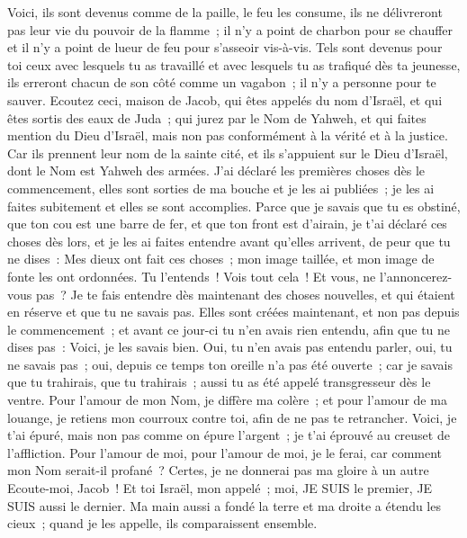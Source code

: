 \begin{multicols}{2}
Voici, ils sont devenus comme de la paille, le feu les consume, ils ne délivreront pas leur vie du pouvoir de la flamme~; il n'y a point de charbon pour se chauffer et il n'y a point de lueur de feu pour s'asseoir vis-à-vis.
Tels sont devenus pour toi ceux avec lesquels tu as travaillé et avec lesquels tu as trafiqué dès ta jeunesse, ils erreront chacun de son côté comme un vagabon~; il n'y a personne pour te sauver.
\VerseOne{}Ecoutez ceci, maison de Jacob, qui êtes appelés du nom d'Israël, et qui êtes sortis des eaux de Juda~; qui jurez par le Nom de Yahweh, et qui faites mention du Dieu d'Israël, mais non pas conformément à la vérité et à la justice.
Car ils prennent leur nom de la sainte cité, et ils s'appuient sur le Dieu d'Israël, dont le Nom est Yahweh des armées.
J'ai déclaré les premières choses dès le commencement, elles sont sorties de ma bouche et je les ai publiées~; je les ai faites subitement et elles se sont accomplies.
Parce que je savais que tu es obstiné, que ton cou est une barre de fer, et que ton front est d'airain,
je t'ai déclaré ces choses dès lors, et je les ai faites entendre avant qu'elles arrivent, de peur que tu ne dises~: Mes dieux ont fait ces choses~; mon image taillée, et mon image de fonte les ont ordonnées.
Tu l'entends~! Vois tout cela~! Et vous, ne l'annoncerez-vous pas~? Je te fais entendre dès maintenant des choses nouvelles, et qui étaient en réserve et que tu ne savais pas.
Elles sont créées maintenant, et non pas depuis le commencement~; et avant ce jour-ci tu n'en avais rien entendu, afin que tu ne dises pas~: Voici, je les savais bien.
Oui, tu n'en avais pas entendu parler, oui, tu ne savais pas~; oui, depuis ce temps ton oreille n'a pas été ouverte~; car je savais que tu trahirais, que tu trahirais~; aussi tu as été appelé transgresseur dès le ventre.
Pour l'amour de mon Nom, je diffère ma colère~; et pour l'amour de ma louange, je retiens mon courroux contre toi, afin de ne pas te retrancher.
Voici, je t'ai épuré, mais non pas comme on épure l'argent~; je t'ai éprouvé au creuset de l'affliction.
Pour l'amour de moi, pour l'amour de moi, je le ferai, car comment mon Nom serait-il profané~? Certes, je ne donnerai pas ma gloire à un autre
Ecoute-moi, Jacob~! Et toi Israël, mon appelé~; moi, JE SUIS le premier, JE SUIS aussi le dernier.
Ma main aussi a fondé la terre et ma droite a étendu les cieux~; quand je les appelle, ils comparaissent ensemble.

\end{multicols}
